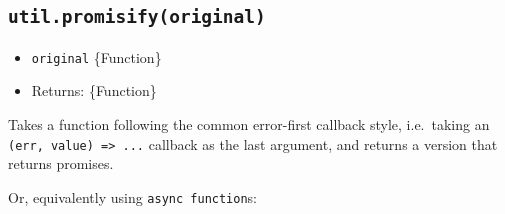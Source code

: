 \subsection{\texorpdfstring{\texttt{util.promisify(original)}}{util.promisify(original)}}\label{util.promisifyoriginal}

\begin{itemize}
\tightlist
\item
  \texttt{original} \{Function\}
\item
  Returns: \{Function\}
\end{itemize}

Takes a function following the common error-first callback style,
i.e.~taking an \texttt{(err,\ value)\ =\textgreater{}\ ...} callback as
the last argument, and returns a version that returns promises.

\begin{Shaded}
\begin{Highlighting}[]
\OperatorTok{=} \NormalTok{(}\NormalTok{)}\OperatorTok{;}
\OperatorTok{=} \NormalTok{(}\NormalTok{)}\OperatorTok{;}

\OperatorTok{=}\NormalTok{)}\OperatorTok{;}
\NormalTok{(}\NormalTok{)}\KeywordTok{=\textgreater{}}\NormalTok{ \{}
\NormalTok{\})}\KeywordTok{=\textgreater{}}\NormalTok{ \{}
\NormalTok{\})}\OperatorTok{;}
\end{Highlighting}
\end{Shaded}

Or, equivalently using \texttt{async\ function}s:

